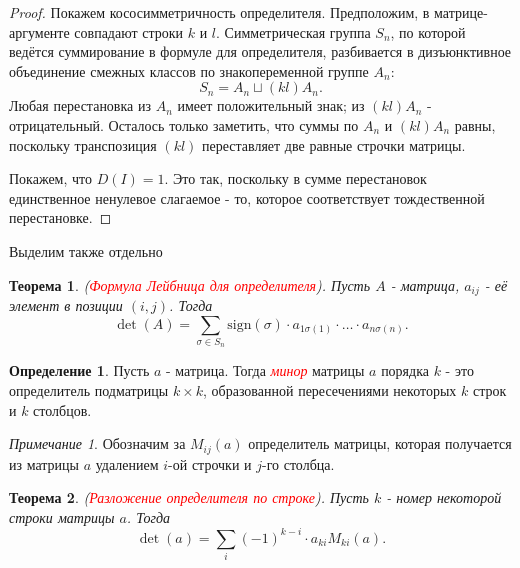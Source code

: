 \documentclass[a4paper,100pt]{article}
\theoremstyle{indented}
\newtheorem{theorem}{Теорема}
\theoremstyle{definition}
\newtheorem{defn}{Определение}
\theoremstyle{remark}
\newtheorem{remark}{Примечание}
\begin{document}
\begin{proof}
    Покажем кососимметричность определителя. Предположим, в матрице-аргументе совпадают строки $k$ и $l$. Симметрическая группа $S_n$, по которой ведётся суммирование в формуле для определителя, разбивается в дизъюнктивное объединение смежных классов по знакопеременной группе $A_n$:
    \[
        S_n=A_n\sqcup (kl)A_n.
    \]
    Любая перестановка из $A_n$ имеет положительный знак; из $(kl)A_n$ - отрицательный. Осталось только заметить, что суммы по $A_n$ и $(kl)A_n$ равны, поскольку транспозиция $(kl)$ переставляет две равные строчки матрицы.\ 

    Покажем, что $D(I)=1$. Это так, поскольку в сумме перестановок единственное ненулевое слагаемое - то, которое соответствует тождественной перестановке.

\end{proof}

Выделим также отдельно\\

\begin{theorem}
    (\hypertarget{n98}{\textcolor{red}{\textit{Формула Лейбница для определителя}}}). Пусть $A$ - матрица, $a_{ij}$ - её элемент в позиции $(i, j)$. Тогда 
    \[
        \det (A)=\sum_{\sigma\in S_n} \text{sign}(\sigma)\cdot a_{1\sigma(1)}\cdot \dots\cdot a_{n\sigma(n)}.
    \]
\end{theorem}

\begin{defn}
    Пусть $a$ - матрица. Тогда \hypertarget{n99}{\textcolor{red}{\textit{минор}}} матрицы $a$ порядка $k$ -  это определитель подматрицы $k\times k$, образованной пересечениями некоторых $k$ строк и $k$ столбцов.
\end{defn}

\begin{remark}
    Обозначим за $M_{ij}(a)$ определитель матрицы, которая получается из матрицы $a$ удалением $i$-ой строчки и $j$-го столбца.
\end{remark}

\begin{theorem}
    (\hypertarget{n100}{\textcolor{red}{\textit{Разложение определителя по строке}}}). Пусть $k$ - номер некоторой строки матрицы $a$. Тогда
    \[
        \det(a)=\sum_i (-1)^{k-i}\cdot a_{ki} M_{ki}(a).
    \]
\end{theorem}
\end{document}
